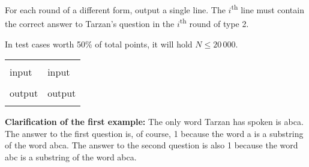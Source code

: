 \strut


For each round of a different form, output a single line. The $i$\textsuperscript{th} line must contain the correct answer to Tarzan's question in the $i$\textsuperscript{th} round of type 2.

\strut


In test cases worth 50\% of total points, it will hold $N \leqslant 20\,000$.

\pagebreak


\begin{center}
\fontfamily{\ttdefault}
\fontsize{10pt}{1em}
\selectfont
\begin{tabu}to 0.99\textwidth{|X[1]|X[1]|}
\hline
& \\ 
\rowfont{\fontsize{10pt}{1em}\bfseries}
input & input \\
 & 
 \\
\rowfont{\fontsize{10pt}{1em}\bfseries}
output & output \\
 & 
 \\
\hline
\end{tabu}
\end{center}

{
\fontsize{10pt}{1em}
\selectfont
\textbf{Clarification of the first example:} The only word Tarzan has spoken is abca. The answer to the first question is, of course, 1 because the word a is a substring of the word abca. The answer to the second question is also 1 because the word abc is a substring of the word abca. \\
}